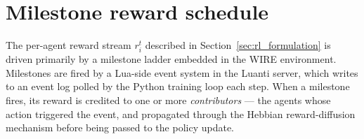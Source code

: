 \documentclass{article}
\theoremstyle{plain}
\theoremstyle{definition}
\theoremstyle{remark}
\begin{document}

\section{Milestone reward schedule}
\label{sec:milestone_table}

The per-agent reward stream $r_i^t$ described in Section~\ref{sec:rl_formulation} is driven primarily by a milestone ladder embedded in the WIRE environment. Milestones are fired by a Lua-side event system in the Luanti server, which writes to an event log polled by the Python training loop each step. When a milestone fires, its reward is credited to one or more \emph{contributors} --- the agents whose action triggered the event, and propagated through the Hebbian reward-diffusion mechanism before being passed to the policy update.
\end{document}
